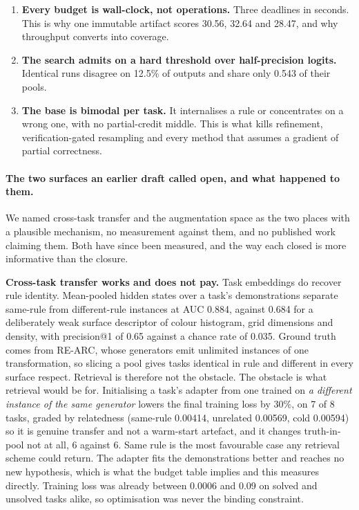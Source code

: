 \documentclass[11pt]{article}
\begin{document}
\begin{enumerate}[leftmargin=1.5em,itemsep=2pt]
\item \textbf{Every budget is wall-clock, not operations.} Three deadlines in seconds. This is why one
immutable artifact scores 30.56, 32.64 and 28.47, and why throughput converts into coverage.
\item \textbf{The search admits on a hard threshold over half-precision logits.} Identical runs
disagree on 12.5\% of outputs and share only 0.543 of their pools.
\item \textbf{The base is bimodal per task.} It internalises a rule or concentrates on a wrong one,
with no partial-credit middle. This is what kills refinement, verification-gated resampling and every
method that assumes a gradient of partial correctness.
\end{enumerate}

\paragraph{The two surfaces an earlier draft called open, and what happened to them.} We named
cross-task transfer and the augmentation space as the two places with a plausible mechanism, no
measurement against them, and no published work claiming them. Both have since been measured, and
the way each closed is more informative than the closure.

\textbf{Cross-task transfer works and does not pay.} Task embeddings do recover rule identity.
Mean-pooled hidden states over a task's demonstrations separate same-rule from different-rule
instances at AUC 0.884, against 0.684 for a deliberately weak surface descriptor of colour histogram,
grid dimensions and density, with precision@1 of 0.65 against a chance rate of 0.035. Ground truth
comes from RE-ARC, whose generators emit unlimited instances of one transformation, so slicing a pool
gives tasks identical in rule and different in every surface respect. Retrieval is therefore not the
obstacle. The obstacle is what retrieval would be for. Initialising a task's adapter from one trained
on \emph{a different instance of the same generator} lowers the final training loss by 30\%, on 7 of
8 tasks, graded by relatedness (same-rule 0.00414, unrelated 0.00569, cold 0.00594) so it is genuine
transfer and not a warm-start artefact, and it changes truth-in-pool not at all, 6 against 6. Same
rule is the most favourable case any retrieval scheme could return. The adapter fits the
demonstrations better and reaches no new hypothesis, which is what the budget table implies and this
measures directly. Training loss was already between 0.0006 and 0.09 on solved and unsolved tasks
alike, so optimisation was never the binding constraint.
\end{document}
